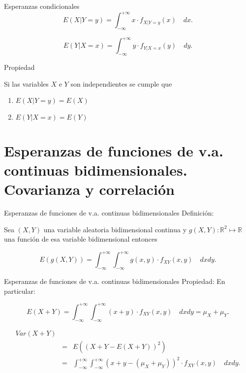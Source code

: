 \documentclass[
  ignorenonframetext,
]{beamer}
\providecommand{\tightlist}{%
  \setlength{\itemsep}{0pt}\setlength{\parskip}{0pt}}
\begin{document}
\begin{frame}{Esperanzas condicionales}
\protect\hypertarget{esperanzas-condicionales}{}
\[E(X|Y=y)=\int_{-\infty}^{+\infty} x\cdot f_{X|Y=y}(x) \quad dx.\]

\[E(Y|X=x)=\int_{-\infty}^{+\infty} y\cdot f_{Y|X=x}(y) \quad dy.\]

Propiedad

Si las variables \(X\) e \(Y\) son independientes se cumple que

\begin{enumerate}
\tightlist
\item
  \(E(X|Y=y)=E(X)\)
\item
  \(E(Y|X=x)=E(Y)\)
\end{enumerate}
\end{frame}

\hypertarget{esperanzas-de-funciones-de-v.a.-continuas-bidimensionales.-covarianza-y-correlaciuxf3n}{%
\section{Esperanzas de funciones de v.a. continuas bidimensionales.
Covarianza y
correlación}\label{esperanzas-de-funciones-de-v.a.-continuas-bidimensionales.-covarianza-y-correlaciuxf3n}}

\begin{frame}{Esperanzas de funciones de v.a. continuas bidimensionales}
\protect\hypertarget{esperanzas-de-funciones-de-v.a.-continuas-bidimensionales}{}
Definición:

Sea \((X,Y)\) una variable aleatoria bidimensional continua y
\(g(X,Y): \mathbb{R}^2\mapsto \mathbb{R}\) una función de esa variable
bidimensional entonces

\[E(g(X,Y))=\int_{-\infty}^{+\infty}\int_{-\infty}^{+\infty} g(x,y) \cdot f_{XY}(x,y) \quad dx dy.\]
\end{frame}

\begin{frame}{Esperanzas de funciones de v.a. continuas bidimensionales}
\protect\hypertarget{esperanzas-de-funciones-de-v.a.-continuas-bidimensionales-1}{}
Propiedad: En particular:

\[
E(X+Y)=\int_{-\infty}^{+\infty}\int_{-\infty}^{+\infty} (x+y)\cdot f_{XY}(x,y) \quad dx dy=\mu_X+\mu_Y.
\]

\[ 
\begin{eqnarray*}
Var(X+Y)&&\\
&=&E\left(\left(X+Y-E(X+Y)\right)^2\right)\\
&=&
\int_{-\infty}^{+\infty}\int_{-\infty}^{+\infty}(x+y-(\mu_X+\mu_Y))^2\cdot f_{XY}(x,y) \quad dx dy.
\end{eqnarray*}
\]
\end{frame}
\end{document}
